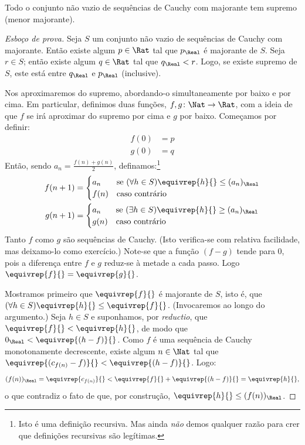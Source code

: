 \documentclass[../../../include/open-logic-section]{subfiles}
\begin{document}
\begin{thm}
Todo o conjunto não vazio de sequências de Cauchy com majorante tem supremo
(menor majorante).
\end{thm}

\begin{proof}[Esboço de prova] Seja $S$ um conjunto não vazio de sequências de
Cauchy com majorante. Então existe algum $p \in \Rat$ tal que
$p_{\Real}$ é majorante de $S$. Seja $r \in S$; então existe algum
$q \in \Rat$ tal que $q_{\Real} < r$. Logo, se existe supremo de $S$, este está
entre $q_\Real$ e $p_\Real$ (inclusive). 

Nos aproximaremos do supremo, abordando-o simultaneamente por baixo e por cima. Em
particular, definimos duas funções, $f, g \colon \Nat \to \Rat$, com a ideia de
que $f$ se irá aproximar do supremo por cima e $g$ por baixo. Começamos por definir:
\begin{align*}
	f(0) &= p \\
	g(0) &= q
\end{align*}
Então, sendo $a_n = \frac{f(n) + g(n)}{2}$, definamos:\footnote{Isto é uma
definição recursiva. Mas ainda \emph{não} demos qualquer razão para crer que
definições recursivas são legítimas.}
\begin{align*}
	f(n+1) &=
	\begin{cases}
		a_n &\text{se }(\forall h \in S)\equivrep{h}{} \leq (a_n)_\Real\\
		f(n)&\text{caso contrário}
	\end{cases}\\
	g(n+1) &=
	\begin{cases}
		a_n &\text{se }(\exists h \in S)\equivrep{h}{} \geq (a_n)_\Real\\
	 	g(n) &\text{caso contrário}
	\end{cases}
\end{align*}
Tanto $f$ como $g$ são sequências de Cauchy. (Isto verifica-se com relativa
facilidade, mas deixamo-lo como exercício.) Note-se que a função $(f-g)$ tende
para $0$, pois a diferença entre $f$ e $g$ reduz-se à metade a cada passo. Logo
$\equivrep{f}{} = \equivrep{g}{}$. 

Mostramos primeiro que $\equivrep{f}{}$ é majorante de $S$, isto é, que $(\forall h \in S)\equivrep{h}{} \leq \equivrep{f}{}$.  
(Invocaremos  ao longo do argumento.) Seja $h \in S$ e
suponhamos, por \emph{reductio}, que $\equivrep{f}{} < \equivrep{h}{}$, de modo que
$0_\Real < \equivrep{(h-f)}{}$. Como $f$ é uma sequência de Cauchy monotonamente
decrescente, existe algum $n \in \Nat$ tal que
$\equivrep{(c_{f(n)} - f)}{} < \equivrep{(h-f)}{}$. Logo:
\[
	(f(n))_\Real = \equivrep{c_{f(n)}}{} < \equivrep{f}{} + \equivrep{(h-f)}{} = \equivrep{h}{},
\]
o que contradiz o fato de que, por construção, $\equivrep{h}{} \leq (f(n))_\Real$.


\end{proof}
\end{document}
